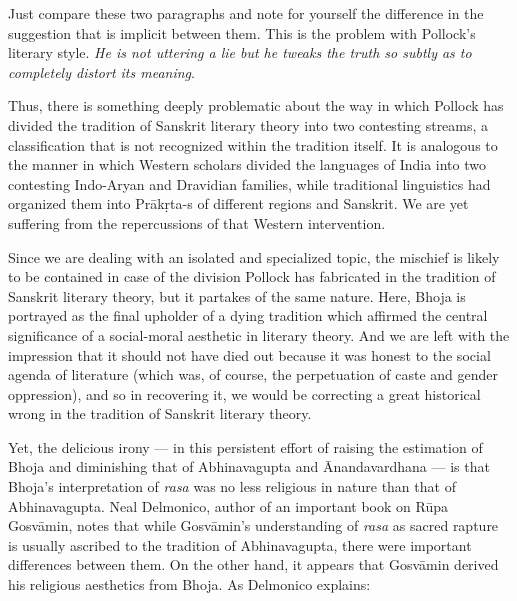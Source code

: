Just compare these two paragraphs and note for yourself the difference in the suggestion that is implicit between them. This is the problem with Pollock's literary style. \textsl{He is not uttering a lie but he tweaks the truth so subtly as to completely distort its meaning}. 

Thus, there is something deeply problematic about the way in which Pollock has divided the tradition of Sanskrit literary theory into two contesting streams, a classification that is not recognized within the tradition itself. It is analogous to the manner in which Western scholars divided the languages of India into two contesting Indo-Aryan and Dravidian families, while traditional linguistics had organized them into Prākṛta-s of different regions and Sanskrit. We are yet suffering from the repercussions of that Western intervention. 

Since we are dealing with an isolated and specialized topic, the mischief is likely to be contained in case of the division Pollock has fabricated in the tradition of Sanskrit literary theory, but it partakes of the same nature. Here, Bhoja is portrayed as the final upholder of a dying tradition which affirmed the central significance of a social-moral aesthetic in literary theory. And we are left with the impression that it should not have died out because it was honest to the social agenda of literature (which was, of course, the perpetuation of caste and gender oppression), and so in recovering it, we would be correcting a great historical wrong in the tradition of Sanskrit literary theory.

Yet, the delicious irony --- in this persistent effort of raising the estimation of Bhoja and diminishing that of Abhinavagupta and Ānandavardhana --- is that Bhoja's interpretation of \textsl{rasa} was no less religious in nature than that of Abhinavagupta. Neal Delmonico, author of an important book on Rūpa Gosvāmin, notes that while Gosvāmin's understanding of \textsl{rasa} as sacred rapture is usually ascribed to the tradition of Abhinavagupta, there were important differences between them. On the other hand, it appears that Gosvāmin derived his religious aesthetics from Bhoja. As Delmonico explains:

